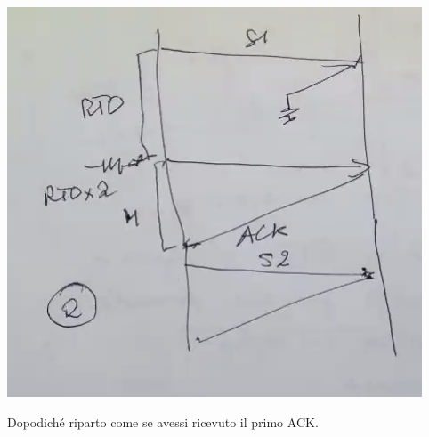 \documentclass[11pt, oneside]{article}   	%
\begin{document}
\begin{center}
\includegraphics[scale=0.5]{rtt1}
\end{center}
Dopodiché riparto come se avessi ricevuto il primo ACK.
\end{document}
